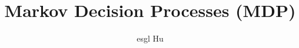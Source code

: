 \documentclass[12pt,a4paper]{article}
\def\allfiles{}
\begin{document}
\title{Markov Decision Processes (MDP)}
\author{esgl Hu}
\maketitle
\fi


\ifx\allfiles\undefined
\end{document}
